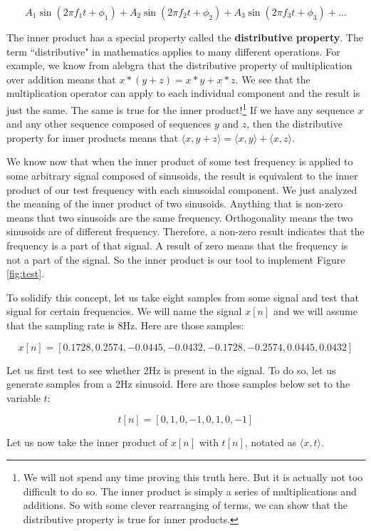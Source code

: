 $$A_1\sin(2\pi f_1 t + \phi_1) + A_2\sin(2 \pi f_2 t + \phi_2) + A_3\sin(2 \pi f_3 t + \phi_3) + ...$$

\noindent The inner product has a special property called the \textbf{distributive property}.
The term ``distributive" in mathematics applies
to many different operations.  For example, we know from alebgra that the distributive property of 
multiplication over addition means that $x * (y + z) = x * y + x * z$.  We see that the multiplication operator can apply
to each individual component and the result is just the same.  The same is true for the inner product!\footnote{
	We will not spend any time proving this truth here.  But it is actually not too difficult to do so.  
	The inner product is simply a series of multiplications and additions.  So with some clever rearranging of terms, 
	we can show that the distributive property is true for inner products.
}
If we have any sequence $x$ and any other
sequence composed of sequences $y$ and $z$, then the distributive property for inner products 
means that  $\langle x, y + z \rangle = \langle x, y \rangle + \langle x, z \rangle$.  

 We know now that when the inner product of some test frequency is 
applied to some arbitrary signal composed of sinusoids, the result is equivalent to the inner product of
our test frequency with each sinusoidal component.  We just analyzed the meaning of the inner product
of two sinusoids.  Anything that is non-zero means that two sinusoids are the same frequency.  Orthogonality
 means the two sinusoids are of different frequency.  Therefore, a non-zero result
indicates that the frequency is a part of that
signal.  A result of zero means that the frequency is not a part of the signal.  So the inner product
is our tool to implement Figure \ref{fig:test}.  

To solidify this concept, let us take eight samples from some signal and test that signal for certain
frequencies.  We will name the signal $x[n]$ and we will assume that the sampling rate is 8Hz.  Here
are those samples:

$$x[n] = [0.1728, 0.2574, -0.0445, -0.0432, -0.1728, -0.2574, 0.0445, 0.0432]$$

\noindent Let us first test to see whether 2Hz is present in the signal.  To do so, let us generate samples
from a 2Hz sinusoid.  Here are those samples below set to the variable $t$:

$$t[n] = [0, 1, 0, -1, 0, 1, 0, -1]$$

\noindent Let us now take the inner product of $x[n]$ with $t[n]$, notated as $\langle x, t \rangle$.

